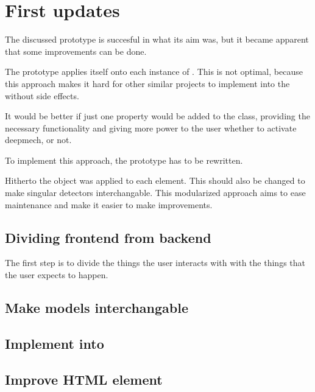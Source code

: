 \section{First updates} \label{ch:first_updates}

The discussed prototype is succesful in what its aim was, but it became apparent that some improvements can be done.

The prototype applies itself onto each instance of .
This is not optimal, because this approach makes it hard for other similar projects to implement into the  without side effects.

It would be better if just one  property would be added to the  class, providing the necessary functionality and giving more power to the user whether to activate deepmech, or not.

To implement this approach, the prototype has to be rewritten.

Hitherto the  object was applied to each  element.
This should also be changed to make singular detectors interchangable.
This modularized approach aims to ease maintenance and make it easier to make improvements.

\subsection{Dividing frontend from backend}

The first step is to divide the things the user interacts with with the things that the user expects to happen.

\subsection{Make models interchangable}

\subsection{Implement into }

\subsection{Improve  HTML element}